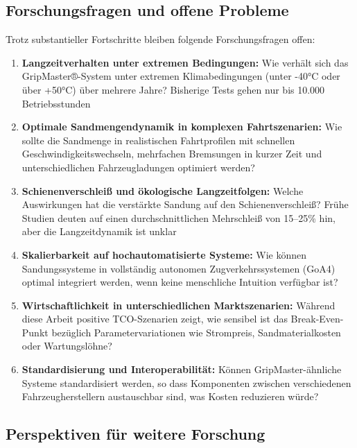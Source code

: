 \documentclass[a4paper,12pt]{article}
\theoremstyle{definition}
\begin{document}
\subsection{Forschungsfragen und offene Probleme}

Trotz substantieller Fortschritte bleiben folgende Forschungsfragen offen:

\begin{enumerate}
	\item \textbf{Langzeitverhalten unter extremen Bedingungen:} Wie verhält sich das GripMaster®-System unter extremen Klimabedingungen (unter -40°C oder über +50°C) über mehrere Jahre? Bisherige Tests gehen nur bis 10.000 Betriebsstunden
	
	\item \textbf{Optimale Sandmengendynamik in komplexen Fahrtszenarien:} Wie sollte die Sandmenge in realistischen Fahrtprofilen mit schnellen Geschwindigkeitswechseln, mehrfachen Bremsungen in kurzer Zeit und unterschiedlichen Fahrzeugladungen optimiert werden?
	
	\item \textbf{Schienenverschleiß und ökologische Langzeitfolgen:} Welche Auswirkungen hat die verstärkte Sandung auf den Schienenverschleiß? Frühe Studien deuten auf einen durchschnittlichen Mehrschleiß von 15--25\% hin, aber die Langzeitdynamik ist unklar
	
	\item \textbf{Skalierbarkeit auf hochautomatisierte Systeme:} Wie können Sandungssysteme in vollständig autonomen Zugverkehrssystemen (GoA4) optimal integriert werden, wenn keine menschliche Intuition verfügbar ist?
	
	\item \textbf{Wirtschaftlichkeit in unterschiedlichen Marktszenarien:} Während diese Arbeit positive TCO-Szenarien zeigt, wie sensibel ist das Break-Even-Punkt bezüglich Parametervariationen wie Strompreis, Sandmaterialkosten oder Wartungslöhne?
	
	\item \textbf{Standardisierung und Interoperabilität:} Können GripMaster-ähnliche Systeme standardisiert werden, so dass Komponenten zwischen verschiedenen Fahrzeugherstellern austauschbar sind, was Kosten reduzieren würde?
\end{enumerate}

\subsection{Perspektiven für weitere Forschung}
\end{document}
